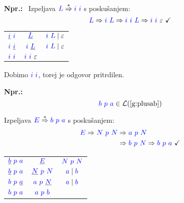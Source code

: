 \documentclass{article}
\newcommand{\Ex}{\textbf{Npr.:}\ }
\newcommand{\OK}{\ \checkmark}
\newcommand{\Symbol}[1]{\textcolor{blue}{#1}}
\newcommand{\Null}{\varepsilon}
\newcommand{\Language}[1]{\mathcal{L}(#1)}
\newcommand{\MathRef}[1]{\text{\ref{#1}}}
\newcommand{\Derive}{\Rightarrow}
\newcommand{\DeriveStar}{\overset{\ast}{\Rightarrow}}
\newcommand{\Seq}{\ }
\newcommand{\Union}{\mathrel{|}}
\begin{document}
\Ex
Izpeljava $\Symbol{L} \DeriveStar \Symbol{i} \Seq \Symbol{i}$ s poskušanjem:
  \begin{equation*}
    \Symbol{L} \Derive \Symbol{i} \Seq \Symbol{L} \Derive \Symbol{i} \Seq \Symbol{i} \Seq \Symbol{L} \Derive \Symbol{i} \Seq \Symbol{i} \Seq \Null \OK
  \end{equation*}
  \begin{center}
  \begin{tabular}{|c|c|c|}
    \hline
    $\underline{\Symbol{i}} \Seq \Symbol{i}$ & $\underline{\Symbol{L}}$ & $\Symbol{i} \Seq \Symbol{L} \Union \Null$ \\ 
    $\Symbol{i} \Seq \underline{\Symbol{i}}$ & $\Symbol{i} \Seq \underline{\Symbol{L}}$ & $\Symbol{i} \Seq \Symbol{L} \Union \Null$ \\ 
    \hline
    $\Symbol{i} \Seq \Symbol{i}$ & $\Symbol{i} \Seq \Symbol{i} \Seq \Null$  &  \\ 
    \hline
  \end{tabular}
  \end{center}
  Dobimo $\Symbol{i} \Seq \Symbol{i}$, torej je odgovor pritrdilen.

\Ex
  \begin{equation*}
    \Symbol{b} \Seq \Symbol{p} \Seq \Symbol{a} \in \Language{\MathRef{g:plusab}}
  \end{equation*}

Izpeljava $\Symbol{E} \DeriveStar \Symbol{b} \Seq \Symbol{p} \Seq \Symbol{a}$ s poskušanjem:
  \begin{equation*}
    \Symbol{E} \Derive \Symbol{N} \Seq \Symbol{p} \Seq \Symbol{N} \begin{aligned}[t]
      &\Derive \Symbol{a} \Seq \Symbol{p} \Seq \Symbol{N}\\
      &\Derive \Symbol{b} \Seq \Symbol{p} \Seq \Symbol{N} \Derive \Symbol{b} \Seq \Symbol{p} \Seq \Symbol{a} \OK
    \end{aligned}
  \end{equation*}

\begin{center}
\begin{tabular}{|c|c|c|}
  \hline
  $\underline{\Symbol{b}} \Seq \Symbol{p} \Seq \Symbol{a}$ & $\underline{\Symbol{E}}$ & $\Symbol{N} \Seq \Symbol{p} \Seq \Symbol{N}$ \\ 
  $\underline{\Symbol{b}} \Seq \Symbol{p} \Seq \Symbol{a}$ & $\underline{\Symbol{N}} \Seq \Symbol{p} \Seq \Symbol{N}$ & $\Symbol{a} \Union \Symbol{b}$ \\ 
  $\Symbol{b} \Seq \Symbol{p} \Seq \underline{\Symbol{a}}$ & $\Symbol{a} \Seq \Symbol{p} \Seq \underline{\Symbol{N}}$ & $\Symbol{a} \Union \Symbol{b}$ \\ 
  \hline
  $\Symbol{b} \Seq \Symbol{p} \Seq \Symbol{a}$ & $\Symbol{a} \Seq \Symbol{p} \Seq \Symbol{b}$ &  \\ 
  \hline
\end{tabular}
\end{center}
\end{document}
